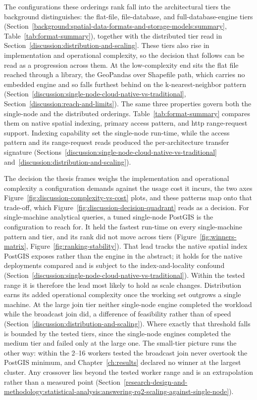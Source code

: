The configurations these orderings rank fall into the architectural tiers the background distinguishes: the flat-file, file-database, and full-database-engine tiers (Section~\ref{background:spatial-data-formats-and-storage-models:summary}, Table~\ref{tab:format-summary}), together with the distributed tier read in Section~\ref{discussion:distribution-and-scaling}. These tiers also rise in implementation and operational complexity, so the decision that follows can be read as a progression across them. At the low-complexity end sits the flat file reached through a library, the GeoPandas over Shapefile path, which carries no embedded engine and so falls furthest behind on the k-nearest-neighbor pattern (Section~\ref{discussion:single-node-cloud-native-vs-traditional}, Section~\ref{discussion:reach-and-limits}). The same three properties govern both the single-node and the distributed orderings. Table~\ref{tab:format-summary} compares them on native spatial indexing, primary access pattern, and \acrshort{http} range-request support. Indexing capability set the single-node run-time, while the access pattern and its range-request reads produced the per-architecture transfer signature (Sections~\ref{discussion:single-node-cloud-native-vs-traditional} and~\ref{discussion:distribution-and-scaling}).

The decision the thesis frames weighs the implementation and operational complexity a configuration demands against the usage cost it incurs, the two axes Figure~\ref{fig:discussion-complexity-vs-cost} plots, and these patterns map onto that trade-off, which Figure~\ref{fig:discussion-decision-quadrant} reads as a decision. For single-machine analytical queries, a tuned single-node PostGIS is the configuration to reach for. It held the fastest run-time on every single-machine pattern and tier, and its rank did not move across tiers (Figure~\ref{fig:winners-matrix}, Figure~\ref{fig:ranking-stability}). That lead tracks the native spatial index PostGIS exposes rather than the engine in the abstract; it holds for the native deployments compared and is subject to the index-and-locality confound (Section~\ref{discussion:single-node-cloud-native-vs-traditional}). Within the tested range it is therefore the lead most likely to hold as scale changes. Distribution earns its added operational complexity once the working set outgrows a single machine. At the large join tier neither single-node engine completed the workload while the broadcast join did, a difference of feasibility rather than of speed (Section~\ref{discussion:distribution-and-scaling}). Where exactly that threshold falls is bounded by the tested tiers, since the single-node engines completed the medium tier and failed only at the large one. The small-tier picture runs the other way: within the \numrange{2}{16} workers tested the broadcast join never overtook the PostGIS minimum, and Chapter~\ref{ch:results} declared no winner at the largest cluster. Any crossover lies beyond the tested worker range and is an extrapolation rather than a measured point (Section~\ref{research-design-and-methodology:statistical-analysis:answering-rq2-scaling-against-single-node}).

